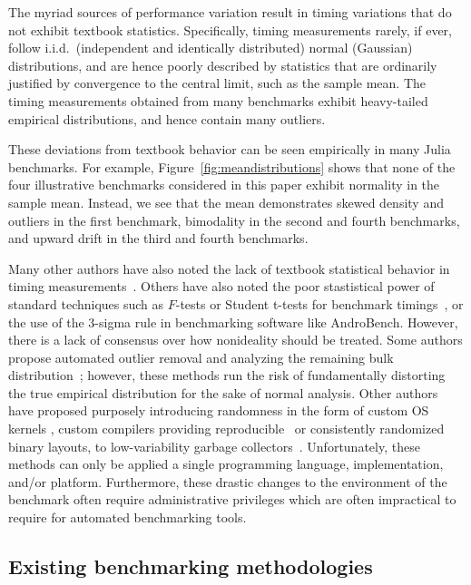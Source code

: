 \documentclass[conference]{IEEEtran}
\begin{document}
The myriad sources of performance variation result in timing variations that do
not exhibit textbook statistics. Specifically, timing measurements rarely, if
ever, follow i.i.d.\ (independent and identically distributed) normal
(Gaussian) distributions, and are hence poorly described by statistics that are
ordinarily justified by convergence to the central limit, such as the sample
mean. The timing measurements obtained from many benchmarks exhibit
heavy-tailed empirical distributions, and hence contain many outliers.

These deviations from textbook behavior can be seen empirically in many Julia
benchmarks. For example, Figure~\ref{fig:meandistributions} shows that none of
the four illustrative benchmarks considered in this paper exhibit normality in
the sample mean. Instead, we see that the mean demonstrates skewed density and
outliers in the first benchmark, bimodality in the second and fourth
benchmarks, and upward drift in the third and fourth benchmarks.

Many other authors have also noted the lack of textbook statistical behavior in
timing measurements~\cite{Gil2011,Chen2015,Rehn2015,Barrett2016}.
Others have also noted the poor stastistical power of standard techniques such
as $F$-tests or Student t-tests for benchmark
timings~\cite{Lilja2000,Mytkowicz2009,Kalibera2013,Chen2015,Barrett2016},
or the use of the 3-sigma rule in benchmarking software like
AndroBench\cite{Kim2012}. However, there is a lack of consensus over how
nonideality should be treated. Some authors propose automated outlier removal
and analyzing the remaining bulk distribution~\cite{Kim2012}; however, these
methods run the risk of fundamentally distorting the true empirical
distribution for the sake of normal analysis. Other authors have proposed
purposely introducing randomness in the form of custom OS kernels
\cite{Tessellation,Akkan2012}, custom compilers providing
reproducible~\cite{Georges2008} or consistently
randomized~\cite{Curtsinger2013} binary layouts, to low-variability garbage
collectors~\cite{Huang2004}. Unfortunately, these methods can only be applied a
single programming language, implementation, and/or platform. Furthermore,
these drastic changes to the environment of the benchmark often require
administrative privileges which are often impractical to require for automated
benchmarking tools.

\subsection{Existing benchmarking methodologies}
\label{sec:existingtools}
\end{document}
